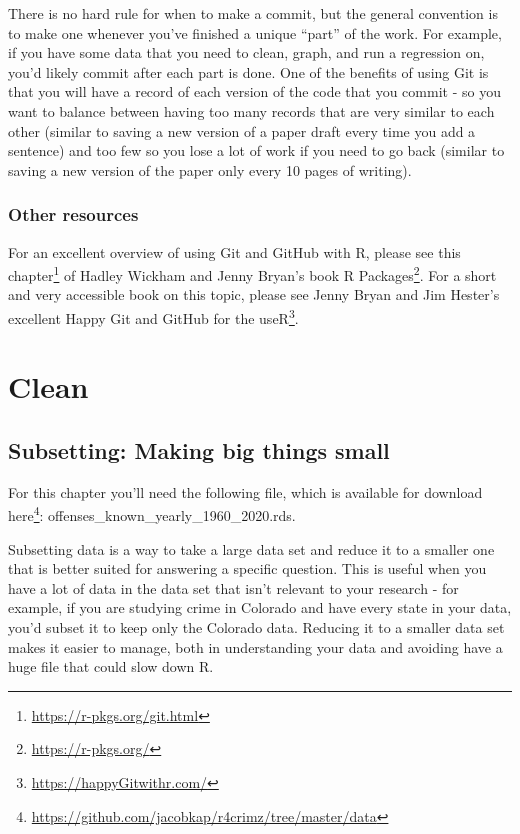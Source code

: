 \documentclass[
]{krantz}
\renewcommand{\href}[2]{#2\footnote{\url{#1}}}
\begin{document}
There is no hard rule for when to make a commit, but the general convention is to make one whenever you've finished a unique ``part'' of the work. For example, if you have some data that you need to clean, graph, and run a regression on, you'd likely commit after each part is done. One of the benefits of using Git is that you will have a record of each version of the code that you commit - so you want to balance between having too many records that are very similar to each other (similar to saving a new version of a paper draft every time you add a sentence) and too few so you lose a lot of work if you need to go back (similar to saving a new version of the paper only every 10 pages of writing).

\hypertarget{other-resources}{%
\section{Other resources}\label{other-resources}}

For an excellent overview of using Git and GitHub with R, please see \href{https://r-pkgs.org/git.html}{this chapter} of Hadley Wickham and Jenny Bryan's book \href{https://r-pkgs.org/}{R Packages}. For a short and very accessible book on this topic, please see Jenny Bryan and Jim Hester's excellent \href{https://happyGitwithr.com/}{Happy Git and GitHub for the useR}.

\hypertarget{part-clean}{%
\part{Clean}\label{part-clean}}

\hypertarget{subsetting-intro}{%
\chapter{Subsetting: Making big things small}\label{subsetting-intro}}

For this chapter you'll need the following file, which is available for download \href{https://github.com/jacobkap/r4crimz/tree/master/data}{here}: offenses\_known\_yearly\_1960\_2020.rds.

Subsetting data is a way to take a large data set and reduce it to a smaller one that is better suited for answering a specific question. This is useful when you have a lot of data in the data set that isn't relevant to your research - for example, if you are studying crime in Colorado and have every state in your data, you'd subset it to keep only the Colorado data. Reducing it to a smaller data set makes it easier to manage, both in understanding your data and avoiding have a huge file that could slow down R.
\end{document}

